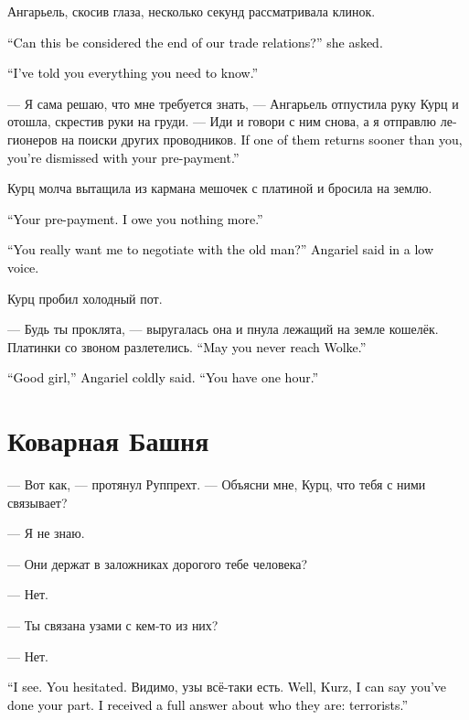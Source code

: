 \documentclass[a4paper,12pt,fleqn]{book}\usepackage{cooltooltips}\usepackage{polyglossia}\setdefaultlanguage[babelshorthands=true]{russian}\setotherlanguage{english}\defaultfontfeatures{Ligatures=TeX,Mapping=tex-text} \usepackage{xcolor}\definecolor{lightgray}{HTML}{bbbbbb}\color{lightgray}\newcommand{\ml}[3]{\textenglish{\textcolor{black}{#3}}}
\begin{document}
Ангарьель, скосив глаза, несколько секунд рассматривала клинок.

\ml{$0$}
{--- Это можно считать окончанием наших торговых отношений? --- осведомилась она.}
{``Can this be considered the end of our trade relations?'' she asked.}

\ml{$0$}
{--- Я тебе сказала всё, что тебе требуется знать.}
{``I've told you everything you need to know.''}

--- Я сама решаю, что мне требуется знать, --- Ангарьель отпустила руку Курц и отошла, скрестив руки на груди.
--- Иди и говори с ним снова, а я отправлю легионеров на поиски других проводников.
\ml{$0$}
{Если они вернутся раньше тебя --- ты свободна, предоплата у тебя на руках.}
{If one of them returns sooner than you, you're dismissed with your pre-payment.''}

Курц молча вытащила из кармана мешочек с платиной и бросила на землю.

\ml{$0$}
{--- Твоя предоплата.}
{``Your pre-payment.}
\ml{$0$}
{Больше я тебе ничем не обязана.}
{I owe you nothing more.''}

\ml{$0$}
{--- Ты серьёзно хочешь, чтобы со стариком пошла говорить я? --- Ангарьель понизила голос.}
{``You really want me to negotiate with the old man?'' Angariel said in a low voice.}

Курц пробил холодный пот.

--- Будь ты проклята, --- выругалась она и пнула лежащий на земле кошелёк.
Платинки со звоном разлетелись.
\ml{$0$}
{--- Надеюсь, ты не достигнешь Вольке.}
{``May you never reach Wolke.''}

\ml{$0$}
{--- Вот и молодец, --- холодно сказала Ангарьель.}
{``Good girl,'' Angariel coldly said.}
\ml{$0$}
{--- Даю час.}
{``You have one hour.''}

\section{Коварная Башня}

--- Вот как, --- протянул Руппрехт.
--- Объясни мне, Курц, что тебя с ними связывает?

--- Я не знаю.

--- Они держат в заложниках дорогого тебе человека?

--- Нет.

--- Ты связана узами с кем-то из них?

--- Нет.

\ml{$0$}
{--- Понятно.}
{``I see.}
\ml{$0$}
{Ты заколебалась.}
{You hesitated.}
Видимо, узы всё-таки есть.
\ml{$0$}
{Ну что ж, Курц, можно сказать, что уговор ты выполнила.}
{Well, Kurz, I can say you've done your part.}
\ml{$0$}
{Я получил исчерпывающий ответ, кто они есть --- террористы.}
{I received a full answer about who they are: terrorists.''}
\end{document}
